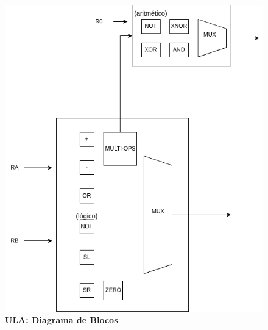 \documentclass{article}
\begin{document}
    \begin{figure}[h]
      \captionsetup{labelformat=empty, skip=0pt}
      \caption{\textbf{ULA: Diagrama de Blocos}}
      \centering
      \noindent\hspace*{0cm}\includegraphics[scale=0.5]{./datapaths/vliw/ulaVliw.png}
    \end{figure}
\end{document}
